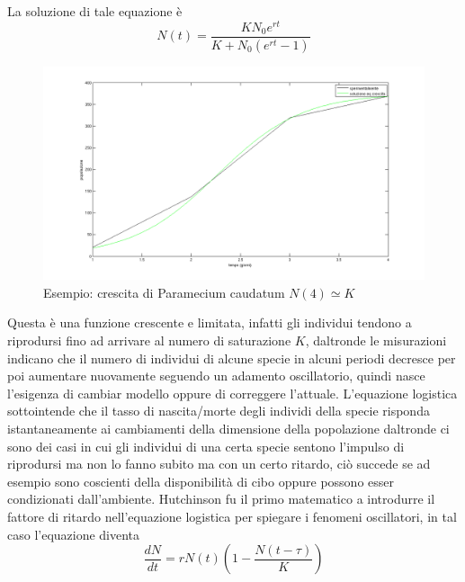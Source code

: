La soluzione di tale equazione è
$$
N(t)= \frac{K N_0 e^{rt}}{K+N_0(e^{rt}-1)}
$$

\begin{figure}[ht]
\centering
\caption{Esempio: crescita di Paramecium caudatum $N(4) \simeq K$}
\includegraphics[width=16cm]{immagini/immagine1.png}
\end{figure}

Questa è una funzione crescente e limitata, infatti gli individui tendono a riprodursi 
fino ad arrivare al numero di saturazione $K$, daltronde le misurazioni indicano che il numero di 
individui di alcune specie in alcuni periodi decresce per poi aumentare nuovamente seguendo un adamento 
oscillatorio, quindi nasce l'esigenza di cambiar modello 
oppure di correggere l'attuale. 
L'equazione logistica sottointende che il tasso di nascita/morte degli individi della specie 
risponda istantaneamente ai cambiamenti della dimensione della popolazione daltronde 
ci sono dei casi in cui gli individui di una certa specie sentono l'impulso di 
riprodursi ma non lo fanno subito ma con un certo ritardo, ciò succede se ad esempio 
sono coscienti della disponibilità di cibo oppure possono esser condizionati dall'ambiente. 
Hutchinson fu il primo matematico a introdurre il fattore di ritardo nell'equazione logistica 
per spiegare i fenomeni oscillatori, in tal caso l'equazione diventa
$$
\frac{d N}{d t} = r N(t) \left(1 - \frac{N(t-\tau)}{K} \right)
$$

